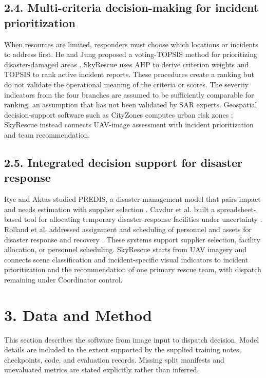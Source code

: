 \documentclass[pdflatex,sn-mathphys-ay]{sn-jnl}
\begin{document}
\subsection*{2.4. Multi-criteria decision-making for incident prioritization}

When resources are limited, responders must choose which locations or incidents to address first. He and Jung proposed a voting-TOPSIS method for prioritizing disaster-damaged areas \cite{ref13}. SkyRescue uses AHP \cite{ref01} to derive criterion weights and TOPSIS \cite{ref02} to rank active incident reports. These procedures create a ranking but do not validate the operational meaning of the criteria or scores. The severity indicators from the four branches are assumed to be sufficiently comparable for ranking, an assumption that has not been validated by SAR experts. Geospatial decision-support software such as CityZones computes urban risk zones \cite{ref28}; SkyRescue instead connects UAV-image assessment with incident prioritization and team recommendation.

\subsection*{2.5. Integrated decision support for disaster response}

Rye and Aktas studied PREDIS, a disaster-management model that pairs impact and needs estimation with supplier selection \cite{ref14}. Cavdur et al. built a spreadsheet-based tool for allocating temporary disaster-response facilities under uncertainty \cite{ref15}. Rolland et al. addressed assignment and scheduling of personnel and assets for disaster response and recovery \cite{ref16}. These systems support supplier selection, facility allocation, or personnel scheduling. SkyRescue starts from UAV imagery and connects scene classification and incident-specific visual indicators to incident prioritization and the recommendation of one primary rescue team, with dispatch remaining under Coordinator control.

\section*{3. Data and Method}

This section describes the software from image input to dispatch decision. Model details are included to the extent supported by the supplied training notes, checkpoints, code, and evaluation records. Missing split manifests and unevaluated metrics are stated explicitly rather than inferred.
\end{document}
